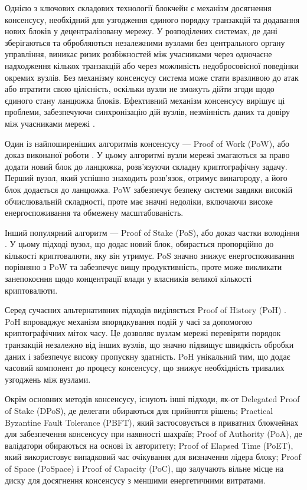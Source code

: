 \documentclass[14pt]{extreport}
\begin{document}
  Однією з ключових складових технології блокчейн є механізм досягнення консенсусу, необхідний для узгодження єдиного порядку транзакцій та додавання нових блоків у децентралізовану мережу. У розподілених системах, де дані зберігаються та обробляються незалежними вузлами без центрального органу управління, виникає ризик розбіжностей між учасниками через одночасне надходження кількох транзакцій або через можливість недобросовісної поведінки окремих вузлів. Без механізму консенсусу система може стати вразливою до атак або втратити свою цілісність, оскільки вузли не зможуть дійти згоди щодо єдиного стану ланцюжка блоків. Ефективний механізм консенсусу вирішує ці проблеми, забезпечуючи синхронізацію дій вузлів, незмінність даних та довіру між учасниками мережі \cite{consensus}.

  Один із найпоширеніших алгоритмів консенсусу — Proof of Work (PoW), або доказ виконаної роботи \cite{pow}. У цьому алгоритмі вузли мережі змагаються за право додати новий блок до ланцюжка, розв’язуючи складну криптографічну задачу. Перший вузол, який успішно знаходить розв’язок, отримує винагороду, а його блок додається до ланцюжка. PoW забезпечує безпеку системи завдяки високій обчислювальній складності, проте має значні недоліки, включаючи високе енергоспоживання та обмежену масштабованість.

  Інший популярний алгоритм — Proof of Stake (PoS), або доказ частки володіння \cite{pos}. У цьому підході вузол, що додає новий блок, обирається пропорційно до кількості криптовалюти, яку він утримує. PoS значно знижує енергоспоживання порівняно з PoW та забезпечує вищу продуктивність, проте може викликати занепокоєння щодо концентрації влади у власників великої кількості криптовалюти.

  Серед сучасних альтернативних підходів виділяється Proof of History (PoH) \cite{poh}. PoH впроваджує механізм впорядкування подій у часі за допомогою криптографічних міток часу. Це дозволяє вузлам мережі перевіряти порядок транзакцій незалежно від інших вузлів, що значно підвищує швидкість обробки даних і забезпечує високу пропускну здатність. PoH унікальний тим, що додає часовий компонент до процесу консенсусу, що знижує необхідність тривалих узгоджень між вузлами.

  Окрім основних методів консенсусу, існують інші підходи, як-от Delegated Proof of Stake (DPoS), де делегати обираються для прийняття рішень; Practical Byzantine Fault Tolerance (PBFT), який застосовується в приватних блокчейнах для забезпечення консенсусу при наявності шахраїв; Proof of Authority (PoA), де валідатори обираються на основі їх авторитету; Proof of Elapsed Time (PoET), який використовує випадковий час очікування для визначення лідера блоку; Proof of Space (PoSpace) і Proof of Capacity (PoC), що залучають вільне місце на диску для досягнення консенсусу з меншими енергетичними витратами.
\end{document}
